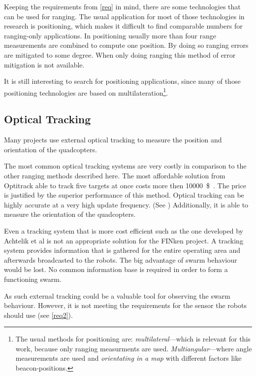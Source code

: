 Keeping the requirements from \autoref{req} in mind, there are some technologies that can be used for ranging.
The usual application for most of those technologies in research is positioning, which makes it difficult to find comparable numbers for ranging-only applications.
In positioning usually more than four range measurements are combined to compute one position.
By doing so ranging errors are mitigated to some degree.
When only doing ranging this method of error mitigation is not available.

It is still interesting to search for positioning applications, since many of those positioning technologies are based on multilateration\footnote{
The usual methods for positioning are: \emph{multilateral}—which is relevant for this work, because only ranging measurments are used. \emph{Multiangular}—where angle measurements are used and \emph{orientating in a map} with different factors like beacon-positions.}.
\cite{_multilateration_2015}

\subsection{Optical Tracking}
Many projects use external optical tracking to measure the position and orientation of the quadcopters. 

The most common optical tracking systems are very costly in comparison to the other ranging methods described here.
The most affordable solution from Optitrack able to track five targets at once costs more then \SI{10000}{\$}~\cite{optitrack.com}.
The price is justified by the superior performance of this method.
Optical tracking can be highly accurate at a very high update frequency. (See \cite{flyingmachinearena})
Additionally, it is able to measure the orientation of the quadcopters.


Even a tracking system that is more cost efficient such as the one developed by Achtelik et al\cite{Achtelik2009} is not an appropriate solution for the FINken project.
A tracking system provides information that is gathered for the entire operating area and afterwards broadcasted to the robots.
The big advantage of swarm behaviour would be lost.
No common information base is required in order to form a functioning swarm.

As such external tracking could be a valuable tool for observing the swarm behaviour.
However, it is not meeting the requirements for the sensor the robots should use (see \autoref{req2}).


